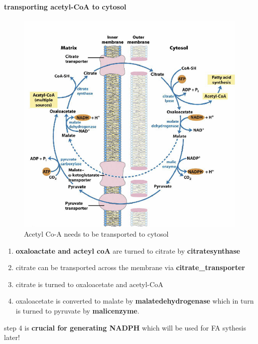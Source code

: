 \documentclass[../main.tex]{subfiles}
\begin{document}
\paragraph{transporting acetyl-CoA to cytosol}
\begin{figure}[H]
    \centering
    \includegraphics[width=0.6\linewidth]{actylCoA.png}
    \caption{Acetyl Co-A needs to be transported to cytosol}
    \label{fig:enter-label}
\end{figure}
\begin{enumerate}
    \item \textbf{oxaloactate and acteyl coA} are turned to citrate by \textbf{\gls{citratesynthase}}
    \item citrate can be transported across the membrane via \textbf{\gls{citrate_transporter}}
    \item citrate is turned to oxaloacetate and acetyl-CoA

    \item oxaloacetate is converted to malate by \textbf{\gls{malatedehydrogenase}} which in turn is turned to pyruvate by \textbf{\gls{malicenzyme}}. 
\end{enumerate}

step 4 is \textbf{crucial for generating NADPH} which will be used for FA sythesis later!
\end{document}
